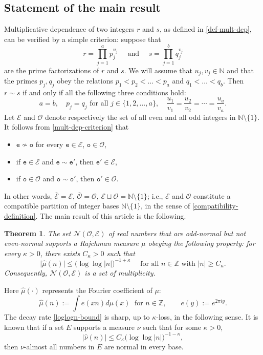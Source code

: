\documentclass[12pt, twoside]{article}
\newtheorem{theorem}{Theorem}[section]
\theoremstyle{definition}
\numberwithin{equation}{section}
\begin{document}
\subsection{Statement of the main result} 
Multiplicative dependence of two integers $r$ and $s$, as defined in \eqref{def-mult-dep}, can be verified by a simple criterion: suppose that 
\[ r= \prod_{j=1}^{a} p_j^{u_j} \quad \text{ and } \quad s = \prod_{j=1}^{b} q_j^{v_j}\]
are the prime factorizations of $r$ and $s$. We will assume that  $u_j, v_j \in \mathbb N$ and that the primes $p_j, q_j$ obey the relations $p_1 < p_2 < \ldots < p_{a}$ and $q_1 < \ldots < q_b$. Then $r \sim s$ if and only if all the following three conditions hold: 
\begin{equation} \label{mult-dep-criterion} 
a = b, \quad p_j = q_j \text{ for all $j \in \{1, 2, \ldots, a\}$}, \quad \frac{u_1}{v_1} =  \frac{u_2}{v_2} = \cdots = \frac{u_a}{v_a}. 
\end{equation}   
Let $\mathscr{E}$ and $\mathscr{O}$ denote respectively the set of all even and all odd integers in $\mathbb N \setminus \{1\}$. It follows from \eqref{mult-dep-criterion} that  
\begin{itemize} 
\item $\mathtt e \not\sim \mathtt o$ for every $\mathtt e \in \mathscr{E}$, $\mathtt o \in \mathscr{O}$, 
\item if $\mathtt e \in \mathscr{E}$ and $\mathtt e \sim \mathtt e'$, then $\mathtt e' \in \mathscr{E}$, 
\item  if $\mathtt o \in \mathscr{O}$ and $\mathtt o \sim \mathtt o'$, then $\mathtt o' \in \mathscr{O}$.  
\end{itemize} 
In other words, $\overline{\mathscr{E}} = \mathscr{E}$, $\overline{\mathscr{O}} = \mathscr{O}$, $\mathscr{E} \sqcup \mathscr{O} = \mathbb N \setminus \{1\}$; i.e., $\mathscr{E}$ and $\mathscr{O}$ constitute a compatible partition of integer bases $\mathbb N \setminus \{1\}$, in the sense of \eqref{compatibility-definition}. The main result of this article is the following. 
\begin{theorem} \label{mainthm}
The set $\mathscr N(\mathscr{O}, \mathscr{E})$ of real numbers that are odd-normal but not even-normal supports a Rajchman measure
$\mu$ obeying the following property: for every $\kappa > 0$, there exists $C_{\kappa} > 0$ such that 
\begin{equation}  \bigl|\widehat{\mu}(n) \bigr| \leq \bigl(\log \log |n|  \bigr)^{-1 + \kappa} \quad \text{ for all $n \in \mathbb Z$ with } |n| \geq C_{\kappa}. \label{loglogn-bound}    
\end{equation}  
Consequently, $\mathscr N(\mathscr{O}, \mathscr{E})$ is a set of multiplicity.  
\end{theorem} 
\noindent Here $\widehat{\mu}(\cdot)$ represents the Fourier coefficient of $\mu$:
\[ \widehat{\mu}(n) := \int e(xn) d \mu(x) \; \text{ for } n \in \mathbb Z, \qquad e(y) := e^{2 \pi iy}.  \]  
The decay rate \eqref{loglogn-bound} is sharp, up to $\kappa$-loss, in the following sense.  It is known \cite[Remark 1, page 8573]{PVZZ} that if a set $E$ supports a measure $\nu$ such that for some $\kappa > 0$, 
\[ \bigl| \widehat{\nu}(n) \bigr| \leq C_{\kappa}\bigl(\log \log |n| \bigr)^{-1 - \kappa},  \]
then $\nu$-almost all numbers in $E$ are normal in every base. 
\end{document}
